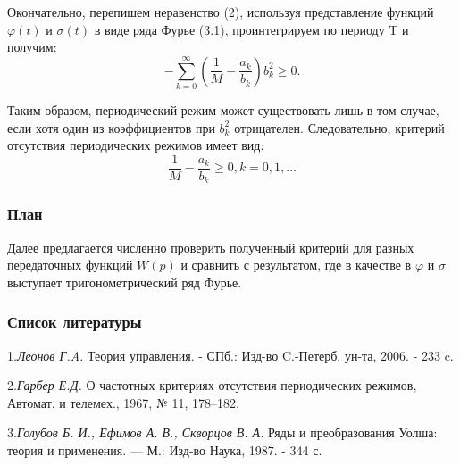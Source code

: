 \documentclass{beamer}
\begin{document}
\begin{frame}\frametitle{}
Окончательно, перепишем неравенство (2), используя представление функций $\varphi(t)$ и $\sigma(t)$ в виде ряда Фурье (3.1), проинтегрируем по периоду T и получим: 
$$ -{\sum\limits^{\infty}_{k=0} {(\frac{1}{M} - \frac{a_k}{b_k}) b_k^2}}\geq 0.$$

Таким образом, периодический режим может существовать лишь в том случае, если хотя один из коэффициентов при $b_k^2$ отрицателен. Следовательно, критерий отсутствия периодических режимов имеет вид: $$ \frac{1}{M} - \frac{a_k}{b_k} \geq 0, k = 0,1,\ldots $$



\end{frame}

\begin{frame}\frametitle{План}
Далее предлагается численно проверить полученный критерий для разных передаточных функций $W(p)$ и сравнить с результатом, где в качестве в $\varphi$ и $\sigma$ выступает тригонометрический ряд Фурье.

\end{frame}


\begin{frame}\frametitle{Список литературы}

1.{\it Леонов Г.A.} Теория управления. - СПб.: Изд-во C.-Петерб. ун-та, 2006. - 233 c.

2.{\it Гарбер Е.Д.} О частотных критериях отсутствия периодических режимов, Автомат. и телемех., 1967, № 11, 178–182.

3.{\it Голубов Б. И., Ефимов А. В., Скворцов В. А.} Ряды и преобразования Уолша: теория и применения. — М.: Изд-во Наука, 1987. - 344 с.

\end{frame}
\end{document}
